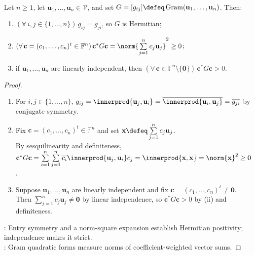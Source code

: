 \begin{proposition} \label{prop:gram-matrix-positive-semidefinite} \\
Let $n\geq1$, let $\mathbf{u}_1,\ldots,\mathbf{u}_n\in\mathcal{V}$, and set $G=[g_{ij}]\defeq\operatorname{Gram}(\mathbf{u}_1,\ldots,\mathbf{u}_n)$. Then:
\begin{enumerate}[label=(\roman*)]
\setlength{\itemsep}{0pt}
\item $(\forall\,i,j\in\{1,\ldots,n\})\,g_{ij}=\overline{g_{ji}}$, so $G$ is Hermitian;
\item $(\forall\,\mathbf{c}=(c_1,\ldots,c_n)^t\in\mathbb{F}^n)\,\mathbf{c}^*G\mathbf{c}=\norm{\sum\limits_{j=1}^{n}c_j\mathbf{u}_j}^2\geq0$;
\item if $\mathbf{u}_1,\ldots,\mathbf{u}_n$ are linearly independent, then $(\forall\,\mathbf{c}\in\mathbb{F}^n\setminus\{\mathbf{0}\})\,\mathbf{c}^*G\mathbf{c}>0$.
\end{enumerate}
\begin{proof}
\begin{enumerate}[label=(\roman*)]
\setlength{\itemsep}{0pt}
\item For $i,j\in\{1,\ldots,n\}$, $g_{ij}=\innerprod{\mathbf{u}_j,\mathbf{u}_i}=\overline{\innerprod{\mathbf{u}_i,\mathbf{u}_j}}=\overline{g_{ji}}$ by conjugate symmetry.
\item Fix $\mathbf{c}=(c_1,\ldots,c_n)^t\in\mathbb{F}^n$ and set $\mathbf{x}\defeq\sum\limits_{j=1}^{n}c_j\mathbf{u}_j$.\\
By sesquilinearity and definiteness, $\mathbf{c}^*G\mathbf{c}=\sum\limits_{i=1}^{n}\sum\limits_{j=1}^{n}\overline{c_i}\innerprod{\mathbf{u}_j,\mathbf{u}_i}c_j=\innerprod{\mathbf{x},\mathbf{x}}=\norm{\mathbf{x}}^2\geq0$.
\item Suppose $\mathbf{u}_1,\ldots,\mathbf{u}_n$ are linearly independent and fix $\mathbf{c}=(c_1,\ldots,c_n)^t\neq\mathbf{0}$.\\
Then $\sum\limits_{j=1}^{n}c_j\mathbf{u}_j\neq\mathbf{0}$ by linear independence, so $\mathbf{c}^*G\mathbf{c}>0$ by (ii) and definiteness.
\end{enumerate}
: Entry symmetry and a norm-square expansion establish Hermitian positivity; independence makes it strict.\\
: Gram quadratic forms measure norms of coefficient-weighted vector sums.
\end{proof}
\end{proposition}
